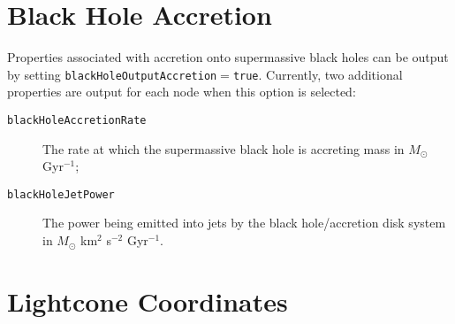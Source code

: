 \section{Black Hole Accretion}

Properties associated with accretion onto supermassive black holes can be output by setting {\tt blackHoleOutputAccretion}$=${\tt true}. Currently, two additional properties are output for each node when this option is selected:
\begin{description}
\item[{\tt blackHoleAccretionRate}] The rate at which the supermassive black hole is accreting mass in $M_\odot$ Gyr$^{-1}$;
\item[{\tt blackHoleJetPower}] The power being emitted into jets by the black hole/accretion disk system in $M_\odot$ km$^2$ s$^{-2}$ Gyr$^{-1}$.
\end{description}

\section{Lightcone Coordinates}\label{sec:OutputLightcone}

